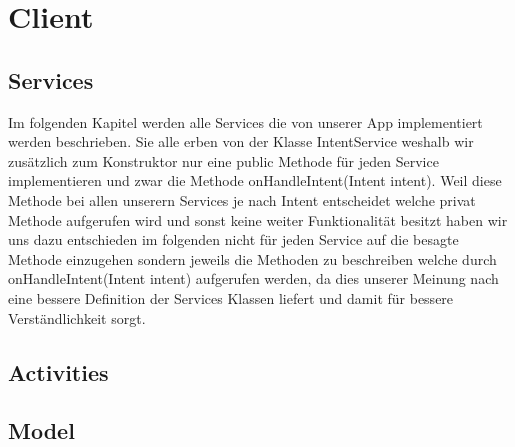 
\section{Client} 
	\subsection{Services}
	Im folgenden Kapitel werden alle Services die von unserer App implementiert werden beschrieben.
	Sie alle erben von der Klasse IntentService weshalb wir zusätzlich zum Konstruktor nur eine public Methode für jeden Service implementieren und zwar die Methode onHandleIntent(Intent intent).
	Weil diese Methode bei allen unserern Services je nach Intent entscheidet welche privat Methode aufgerufen wird und sonst keine weiter Funktionalität besitzt haben wir uns dazu entschieden im folgenden nicht für jeden Service auf die besagte Methode einzugehen sondern jeweils die Methoden zu beschreiben welche durch onHandleIntent(Intent intent) aufgerufen werden, da dies unserer Meinung nach eine bessere Definition der Services Klassen liefert und damit für bessere Verständlichkeit sorgt. 
	\subsection{Activities}
	\subsection{Model}
	\newpage